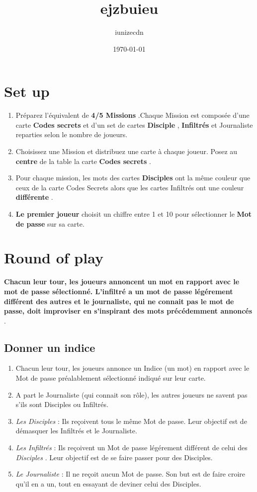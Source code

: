 \documentclass{article}%
\title{ejzbuieu}%
\author{iunizecdn}%
\date{\today}%
\begin{document}
%
\pagestyle{empty}%
\normalsize%
\maketitle%
\section{ Set up
}%
\label{sec:Setup}%
\begin{enumerate}%
\item%
%
 Préparez l'équivalent de %
\textbf{4/5 Missions}%
.Chaque Mission est composée d'une carte %
\textbf{Codes secrets}%
 et d'un set de cartes %
\textbf{Disciple}%
,%
\textbf{Infiltrés}%
 et Journaliste reparties selon le nombre de joueurs.
%
\item%
%
 Choisissez une Mission et distribuez une carte à chaque joueur. Posez au %
\textbf{centre}%
 de la table la carte %
\textbf{Codes secrets}%
.
%
\item%
%
 Pour chaque mission, les mots des cartes %
\textbf{Disciples}%
 ont la même couleur que ceux de la carte Codes Secrets alors que les cartes Infiltrés ont une couleur %
\textbf{différente}%
.
%
\item%
%
\textbf{Le premier joueur}%
 choisit un chiffre entre 1 et 10 pour sélectionner le %
\textbf{Mot de passe}%
 sur sa carte.
%
\end{enumerate}

%
\section{ Round of play
}%
\label{sec:Roundofplay}%
\textbf{Chacun leur tour, les joueurs annoncent un mot en rapport avec le mot de passe sélectionné. L'infiltré a un mot de passe légérement différent des autres et le journaliste, qui ne connait pas le mot de passe, doit improviser en s'inspirant des mots précédemment annoncés}%
.


%
\subsection{ Donner un indice
}%
\label{subsec:Donnerunindice}%
\begin{enumerate}%
\item%
%
 Chacun leur tour, les joueurs annonce un Indice (un mot) en rapport avec le Mot de passe préalablement sélectionné indiqué sur leur carte.
%
\item%
%
 A part le Journaliste (qui connait son rôle), les autres joueurs ne savent pas s'ils sont Disciples ou Infiltrés.
%
\item%
%
\textit{Les Disciples}%
 : Ils reçoivent tous le même Mot de passe. Leur objectif est de démasquer les Infiltrés et le Journaliste.
%
\item%
%
\textit{Les Infiltrés}%
 : Ils reçoivent un Mot de passe légérement différent de celui des %
\textit{Disciples}%
. Leur objectif est de se faire passer pour des Disciples.
%
\item%
%
\textit{Le Journaliste}%
 : Il ne reçoit aucun Mot de passe. Son but est de faire croire qu'il en a un, tout en essayant de deviner celui des Disciples.
%
\end{enumerate}
\end{document}
